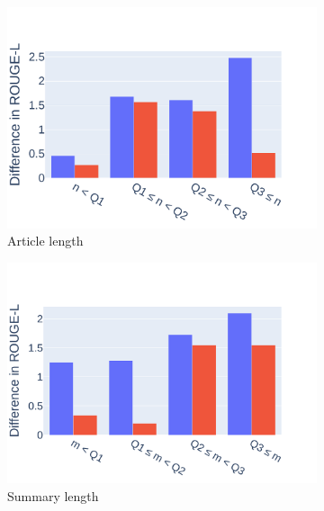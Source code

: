 \begin{figure}
    \centering
    \begin{subfigure}[b]{0.32\textwidth}
        \includegraphics[width=1\textwidth]{images/chapter5/diff_in_len_barchart_nolegend.pdf}
        \caption{Article length}
    \end{subfigure}
    \begin{subfigure}[b]{0.32\textwidth}
        \includegraphics[width=\textwidth]{images/chapter5/diff_out_len_barchart_nolegend.pdf}
        \caption{Summary length}
    \end{subfigure}
    \begin{subfigure}[b]{0.32\textwidth}

\end{subfigure}
\end{figure}
